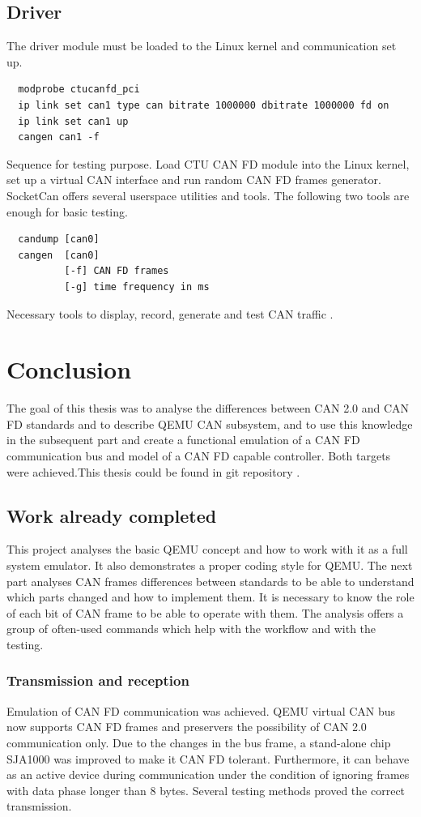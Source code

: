 \documentclass{ctuthesis}
\begin{document}
 \section{Driver}
 The driver module must be loaded to the Linux kernel and communication set up.
 \begin{verbatim}  modprobe ctucanfd_pci
  ip link set can1 type can bitrate 1000000 dbitrate 1000000 fd on
  ip link set can1 up
  cangen can1 -f\end{verbatim}
 Sequence for testing purpose. Load CTU CAN FD module into the Linux kernel, set up a virtual CAN interface and run random CAN FD frames generator.\\
 SocketCan offers several userspace utilities and tools. The following two tools are enough for basic testing.
 \begin{verbatim}  candump [can0]
  cangen  [can0]
          [-f] CAN FD frames
          [-g] time frequency in ms\end{verbatim}
 Necessary tools to display, record, generate and test CAN traffic \cite{can-utils}.

 
\chapter{Conclusion}
 The goal of this thesis was to analyse the differences between CAN 2.0 and CAN FD standards and to describe QEMU CAN subsystem, and to use this knowledge in the subsequent part and create a functional emulation of a CAN FD communication bus and model of a CAN FD capable controller. Both targets were achieved.This thesis could be found in git repository \cite{thesis-repo}.

 \section{Work already completed}
  This project analyses the basic QEMU concept and how to work with it as a full system emulator. It also demonstrates a proper coding style for QEMU. The next part analyses CAN frames differences between standards to be able to understand which parts changed and how to implement them. It is necessary to know the role of each bit of CAN frame to be able to operate with them. The analysis offers a group of often-used commands which help with the workflow and with the testing.
 
 \subsection{Transmission and reception}
  Emulation of CAN FD communication was achieved. QEMU virtual CAN bus now supports CAN FD frames and preservers the possibility of CAN 2.0 communication only. Due to the changes in the bus frame, a stand-alone chip SJA1000 was improved to make it CAN FD tolerant. Furthermore, it can behave as an active device during communication under the condition of ignoring frames with data phase longer than 8 bytes. Several testing methods proved the correct transmission.
\end{document}
